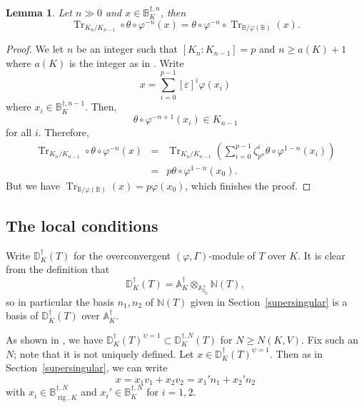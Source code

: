\documentclass{amsart}
\newcommand{\QQ}{\mathbb Q}
\newcommand{\BB}{\mathbb B}
\newcommand{\DD}{\mathbb D}
\renewcommand{\AA}{\mathbb A}
\newcommand{\NN}{\mathbb N}
\DeclareMathOperator{\Tr}{Tr}
\DeclareMathOperator{\rig}{rig}
\newcommand{\Qp}{\QQ_p}
\newcommand{\vp}{\varphi}
\newtheorem{lemma}[theorem]{Lemma}
\begin{document}
  \begin{lemma}\label{comptrace}
   Let $n\gg0$ and $x\in\BB_{K}^{\dagger,n}$, then
   \[
    \Tr_{K_n/K_{n-1}}\circ \theta\circ\vp^{-n}(x)=\theta\circ\vp^{-n}\circ\Tr_{\BB/\vp(\BB)}(x).
   \]
  \end{lemma}
  \begin{proof}
   We let $n$ be an integer such that $[K_n:K_{n-1}]=p$ and $n\ge a(K)+1$ where $a(K)$ is the integer as in \cite[Proposition~III.2.1]{cherbonniercolmez99}. Write
   \[
    x=\sum_{i=0}^{p-1}[\varepsilon]^i\vp(x_i)
   \]
   where $x_i\in\BB_{K}^{\dagger,n-1}$. Then,
   \[
    \theta\circ\vp^{-n+1}(x_i)\in K_{n-1}
   \]
   for all $i$. Therefore,
   \begin{eqnarray*}
    \Tr_{K_n/K_{n-1}}\circ \theta\circ\vp^{-n}(x)&=&\Tr_{K_n/K_{n-1}}\left(\sum_{i=0}^{p-1}\zeta_{p^n}^i\theta\circ\vp^{1-n}(x_i)\right)\\
    &=&p\theta\circ\vp^{1-n}(x_0).
   \end{eqnarray*}
   But we have $\Tr_{\BB/\vp(\BB)}(x)=p\vp(x_0)$, which finishes the proof.
  \end{proof}
  
  
 \subsection{The local conditions}

  Write $\DD_K^\dagger(T)$ for the overconvergent $(\vp,\Gamma)$-module of $T$ over $K$. It is clear from the definition that
  \[ \DD^\dagger_K(T)=\AA^\dagger_K\otimes_{\AA^+_{\Qp}}\NN(T),\]
  so in particular the basis $n_1,n_2$ of $\NN(T)$ given in Section~\ref{supersingular} is a basis of $\DD^\dagger_K(T)$ over $\AA^\dagger_K$.

  As shown in \cite[Proposition III.3.2]{cherbonniercolmez99}, we have 
  $\DD^\dagger_K(T)^{\psi=1}\subset \DD^{\dagger,N}_K(T)$  for $N\ge N(K,V)$. Fix such an $N$; note that it is not uniquely defined. Let $x\in \DD^\dagger_K(T)^{\psi=1}$. Then as in Section~\ref{supersingular}, we can write 
  \[x=x_1v_1+x_2v_2=x_1'n_1+x_2'n_2\]
  with $x_i\in\BB^{\dagger,N}_{\rig,K}$ and $x_i'\in \BB^{\dagger,N}_{K}$ for $i=1,2$.
\end{document}
